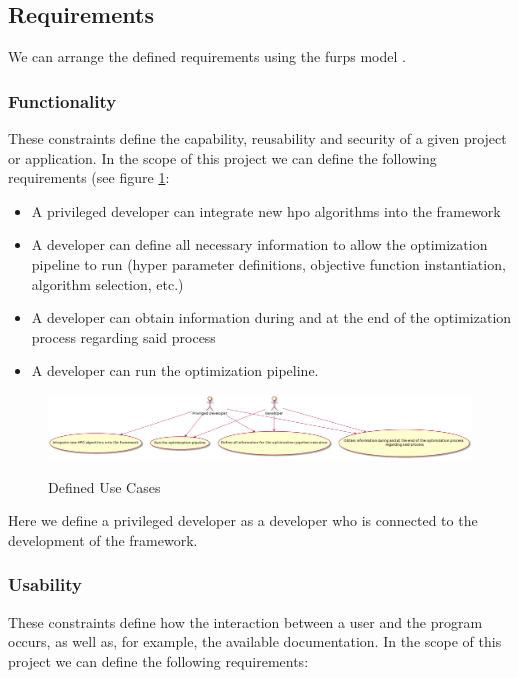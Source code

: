 
\subsection{Requirements}

We can arrange the defined requirements using the \acrfull{furps} model \parencite{furps}.

\subsubsection{Functionality}

These constraints define the capability, reusability and security of a given project or application. In the scope of this project we can define the following requirements (see figure \ref{fig:usecases}:

\begin{itemize}
	\item A privileged developer can integrate new \acrshort{hpo} algorithms into the framework
	\item A developer can define all necessary information to allow the optimization pipeline to run (hyper parameter definitions, objective function instantiation, algorithm selection, etc.)
	\item A developer can obtain information during and at the end of the optimization process regarding said process
	\item A developer can run the optimization pipeline.
\end{itemize}

\begin{figure}[hb]
\centering
\includegraphics[width = \textwidth]{images/domain_model.png}
\label{fig:usecases}
\caption{Defined Use Cases}
\end{figure}


Here we define a privileged developer as a developer who is connected to the development of the framework.

\subsubsection{Usability}

These constraints define how the interaction between a user and the program occurs, as well as, for example, the available documentation. In the scope of this project we can define the following requirements:

